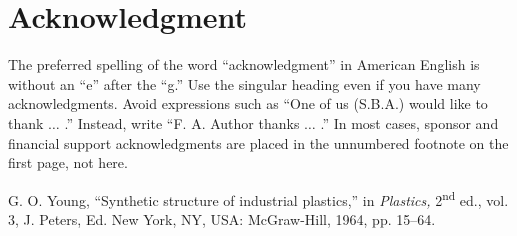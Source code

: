 \documentclass{ieeeaccess}
\begin{document}
\section*{Acknowledgment}
The preferred spelling of the word ``acknowledgment'' in American English is
without an ``e'' after the ``g.'' Use the singular heading even if you have
many acknowledgments. Avoid expressions such as ``One of us (S.B.A.) would
like to thank $\ldots$ .'' Instead, write ``F. A. Author thanks $\ldots$ .'' In most
cases, sponsor and financial support acknowledgments are placed in the
unnumbered footnote on the first page, not here.


\begin{thebibliography}{00}

 G. O. Young, ``Synthetic structure of industrial plastics,'' in \emph{Plastics,} 2\textsuperscript{nd} ed., vol. 3, J. Peters, Ed. New York, NY, USA: McGraw-Hill, 1964, pp. 15--64.

\end{thebibliography}

\EOD
\end{document}
